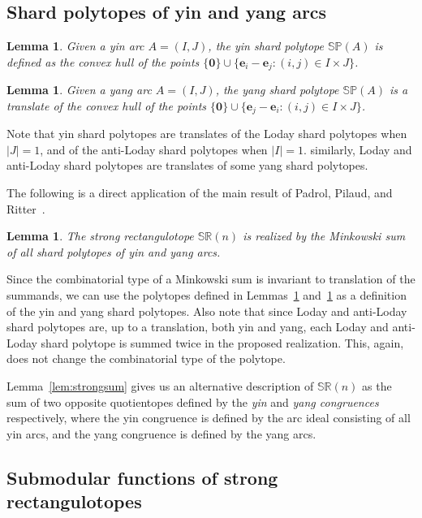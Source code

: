 \documentclass{amsart}
\newtheorem{lemma}[theorem]{Lemma}
\theoremstyle{definition}
\newcommand{\darkblue}{\color{darkblue}} %
\newcommand{\defn}[1]{\textsl{\darkblue #1}} %
\newcommand{\polytope}[1]{\mathds{#1}} %
\newcommand{\SRP}{\polytope{SR}} %
\newcommand{\SP}{\polytope{SP}}
\begin{document}
\subsection{Shard polytopes of yin and yang arcs}

\begin{lemma}
  \label{lem:yinsp}
  Given a yin arc $A=(I,J)$, the yin shard polytope $\SP(A)$ is defined as the convex hull of the points
  $\{\mathbf{0} \}\cup \{ \mathbf{e}_i - \mathbf{e}_j : (i,j)\in I\times J\}$.
\end{lemma}

\begin{lemma}
  \label{lem:yangsp}
  Given a yang arc $A=(I,J)$, the yang shard polytope $\SP(A)$ is a translate of the convex hull of the points
  $\{\mathbf{0} \}\cup \{ \mathbf{e}_j - \mathbf{e}_i : (i,j)\in I\times J\}$.
\end{lemma}

Note that yin shard polytopes are translates of the Loday shard polytopes when $|J|=1$, and of the anti-Loday shard polytopes when $|I|=1$.
similarly, Loday and anti-Loday shard polytopes are translates of some yang shard polytopes.

The following is a direct application of the main result of Padrol, Pilaud, and Ritter~\cite{MR4584712}.

\begin{lemma}
  \label{lem:strongMinkowski}
  The strong rectangulotope $\SRP(n)$ is realized by the Minkowski sum of all shard polytopes of yin and yang arcs.
\end{lemma}

Since the combinatorial type of a Minkowski sum is invariant to translation of the summands, we can use the polytopes defined in Lemmas~\ref{lem:yinsp} and~\ref{lem:yangsp} as a definition of the yin and yang shard polytopes.
Also note that since Loday and anti-Loday shard polytopes are, up to a translation, both yin and yang, each Loday and anti-Loday shard polytope is summed twice in the proposed realization.
This, again, does not change the combinatorial type of the polytope.

Lemma~\ref{lem:strongsum} gives us an alternative description of $\SRP(n)$ as the sum of two opposite quotientopes defined by the \defn{yin} and \defn{yang congruences} respectively, where the yin congruence is defined by the arc ideal consisting of all yin arcs, and the yang congruence is defined by the yang arcs.

\subsection{Submodular functions of strong rectangulotopes}
\end{document}
